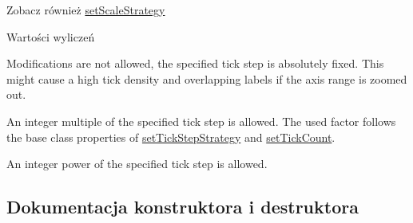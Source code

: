 \begin{DoxySeeAlso}{Zobacz również}
\hyperlink{class_q_c_p_axis_ticker_fixed_acbc7c9bcd80b3dc3edee5f0519d301f6}{set\+Scale\+Strategy} 
\end{DoxySeeAlso}
\begin{Desc}
\item[Wartości wyliczeń]\par
\begin{description}
\item[{\em 
ss\+None\hypertarget{class_q_c_p_axis_ticker_fixed_a15b3d38b935d404b1311eb85cfb6a439a6621275677a05caa0de204ae3956b85f}{}\label{class_q_c_p_axis_ticker_fixed_a15b3d38b935d404b1311eb85cfb6a439a6621275677a05caa0de204ae3956b85f}
}]Modifications are not allowed, the specified tick step is absolutely fixed. This might cause a high tick density and overlapping labels if the axis range is zoomed out. \item[{\em 
ss\+Multiples\hypertarget{class_q_c_p_axis_ticker_fixed_a15b3d38b935d404b1311eb85cfb6a439a22f651785f6412645837421896561104}{}\label{class_q_c_p_axis_ticker_fixed_a15b3d38b935d404b1311eb85cfb6a439a22f651785f6412645837421896561104}
}]An integer multiple of the specified tick step is allowed. The used factor follows the base class properties of \hyperlink{class_q_c_p_axis_ticker_a73b1d847c1a12159af6bfda4ebebe7d5}{set\+Tick\+Step\+Strategy} and \hyperlink{class_q_c_p_axis_ticker_a47752abba8293e6dc18491501ae34008}{set\+Tick\+Count}. \item[{\em 
ss\+Powers\hypertarget{class_q_c_p_axis_ticker_fixed_a15b3d38b935d404b1311eb85cfb6a439ac39d5813e9165ebd494307ae61ce5dce}{}\label{class_q_c_p_axis_ticker_fixed_a15b3d38b935d404b1311eb85cfb6a439ac39d5813e9165ebd494307ae61ce5dce}
}]An integer power of the specified tick step is allowed. \end{description}
\end{Desc}


\subsection{Dokumentacja konstruktora i destruktora}
